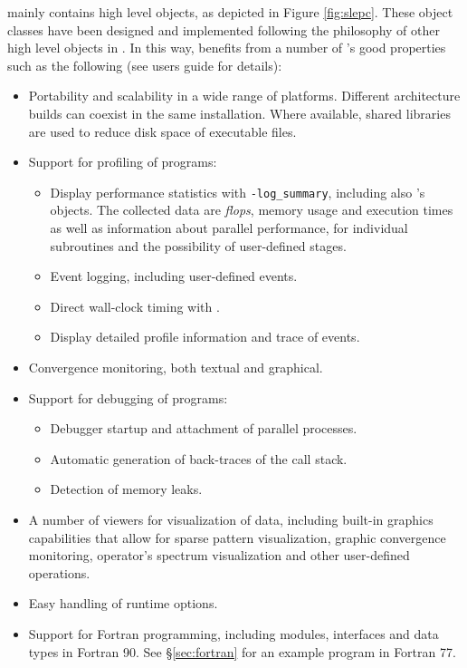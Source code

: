 	\slepc mainly contains high level objects, as depicted in Figure \ref{fig:slepc}. These object classes have been designed and implemented following the philosophy of other high level objects in \petsc. In this way, \slepc benefits from a number of \petsc's good properties such as the following (see \petsc{} users guide for details):
\begin{itemize}
\item Portability and scalability in a wide range of platforms. Different architecture builds can coexist in the same installation. Where available, shared libraries are used to reduce disk space of executable files.
\item Support for profiling of programs:
  \begin{itemize}
  \setlength{\itemsep}{0mm}
  \item Display performance statistics with \Verb!-log_summary!, including also \slepc's objects. The collected data are \emph{flops}, memory usage and execution times as well as information about parallel performance, for individual subroutines and the possibility of user-defined stages.
  \item Event logging, including user-defined events.
  \item Direct wall-clock timing with .
  \item Display detailed profile information and trace of events.
  \end{itemize}
\item Convergence monitoring, both textual and graphical.
\item Support for debugging of programs:
  \begin{itemize}
  \setlength{\itemsep}{0mm}
  \item Debugger startup and attachment of parallel processes.
  \item Automatic generation of back-traces of the call stack.
  \item Detection of memory leaks.
  \end{itemize}
\item A number of viewers for visualization of data, including built-in graphics capabilities that allow for sparse pattern visualization, graphic convergence monitoring, operator's spectrum visualization and other user-defined operations.
\item Easy handling of runtime options.
\item Support for Fortran programming, including modules, interfaces and data types in Fortran 90. See \S\ref{sec:fortran} for an example program in Fortran 77.
\end{itemize}

